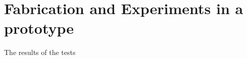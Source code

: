 \chapter{Fabrication and Experiments in a prototype}
\label{Cap:Fabrication}
%

The results of the tests